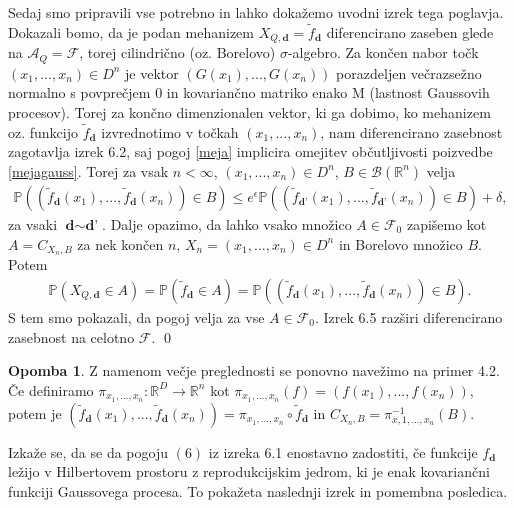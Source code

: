 \documentclass[12pt,a4paper]{amsart}
\theoremstyle{definition} %
\newtheorem{opomba}[definicija]{Opomba}
\theoremstyle{plain} %
\begin{document}
Sedaj smo pripravili vse potrebno in lahko dokažemo uvodni izrek tega poglavja.
Dokazali bomo, da je podan mehanizem $X_{Q,\textbf{d}} = \tilde{f}_{\textbf{d}}$ diferencirano zaseben glede na $\mathcal{A}_Q = \mathcal{F}$, torej cilindrično (oz. Borelovo) $\sigma$-algebro. Za končen nabor točk $(x_1,...,x_n) \in D^n$ je vektor $(G(x_1),...,G(x_n))$ porazdeljen večrazsežno normalno s povprečjem 0 in kovariančno matriko enako M (lastnost Gaussovih procesov). Torej za končno dimenzionalen vektor, ki ga dobimo, ko mehanizem oz. funkcijo $\tilde{f}_{\textbf{d}}$ izvrednotimo v točkah $(x_1,...,x_n) $, nam diferencirano zasebnost zagotavlja izrek 6.2, saj pogoj \eqref{meja} implicira omejitev občutljivosti poizvedbe \eqref{mejagauss}. Torej za vsak $n < \infty$, $(x_1,...,x_n) \in D^n$, $B \in \mathcal{B}(\mathbb{R}^n)$ velja
\begin{gather*}
\mathbb{P}((\tilde{f}_{\textbf{d}}(x_1),...,\tilde{f}_{\textbf{d}}(x_n)) \in B) \leq e^{\epsilon}\mathbb{P}((\tilde{f}_{\textbf{d'}}(x_1),...,\tilde{f}_{\textbf{d'}}(x_n)) \in B) + \delta,
\end{gather*}
za vsaki $\textbf{d} \sim \textbf{d'}$. Dalje opazimo, da lahko vsako množico $A \in \mathcal{F}_0$ zapišemo kot $A = C_{X_n,B}$ za nek končen $n$, $X_n = (x_1,...,x_n) \in D^n$ in Borelovo množico $B$. Potem 
\begin{gather*}
\mathbb{P}(X_{Q,\textbf{d}} \in A) = \mathbb{P}(\tilde{f}_{\textbf{d}}\in A)= \mathbb{P}((\tilde{f}_{\textbf{d}}(x_1),...,\tilde{f}_{\textbf{d}}(x_n)) \in B).
\end{gather*}
S tem smo pokazali, da pogoj velja za vse $A \in \mathcal{F}_0$. Izrek 6.5 razširi diferencirano zasebnost na celotno $\mathcal{F}$.
\qed
\newline
\newline
\begin{opomba}
Z namenom večje preglednosti se ponovno navežimo na primer 4.2. Če definiramo $\pi_{x_1,...,x_n} : \mathbb{R}^D \rightarrow \mathbb{R}^n$ kot $\pi_{x_1,...,x_n}(f) = (f(x_1),...,f(x_n))$, potem je $(\tilde{f}_{\textbf{d}}(x_1),...,\tilde{f}_{\textbf{d}}(x_n)) = \pi_{x_1,...,x_n} \circ \tilde{f}_{\textbf{d}}$ in $C_{X_n,B} = \pi_{x,1,...,x_n}^{-1}(B)$.
\end{opomba}
Izkaže se, da se da pogoju $(6)$ iz izreka 6.1 enostavno zadostiti, če funkcije $f_{\textbf{d}}$ ležijo v Hilbertovem prostoru z reprodukcijskim jedrom, ki je enak kovariančni funkciji Gaussovega procesa. To pokažeta naslednji izrek in pomembna posledica.
\end{document}
